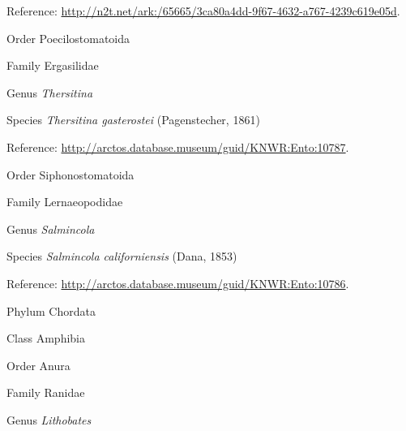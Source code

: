 \documentclass[9pt, article]{memoir}
\begin{document}
\begin{multicols}{2}
Reference: 
\url{http://n2t.net/ark:/65665/3ca80a4dd-9f67-4632-a767-4239c619e05d}.

\vspace{6pt}\noindent\hspace{18pt}Order Poecilostomatoida


\vspace{6pt}\noindent\hspace{24pt}Family Ergasilidae


\vspace{6pt}\noindent\hspace{30pt}Genus \textit{Thersitina}


\vspace{6pt}\noindent\hspace{36pt}Species \textit{Thersitina gasterostei} (Pagenstecher, 1861)


Reference: 
\url{http://arctos.database.museum/guid/KNWR:Ento:10787}.

\vspace{6pt}\noindent\hspace{18pt}Order Siphonostomatoida


\vspace{6pt}\noindent\hspace{24pt}Family Lernaeopodidae


\vspace{6pt}\noindent\hspace{30pt}Genus \textit{Salmincola}


\vspace{6pt}\noindent\hspace{36pt}Species \textit{Salmincola californiensis} (Dana, 1853)


Reference: 
\url{http://arctos.database.museum/guid/KNWR:Ento:10786}.

\vspace{6pt}\noindent\hspace{6pt}Phylum Chordata


\vspace{6pt}\noindent\hspace{12pt}Class Amphibia


\vspace{6pt}\noindent\hspace{18pt}Order Anura


\vspace{6pt}\noindent\hspace{24pt}Family Ranidae


\vspace{6pt}\noindent\hspace{30pt}Genus \textit{Lithobates}



\end{multicols}
\end{document}
